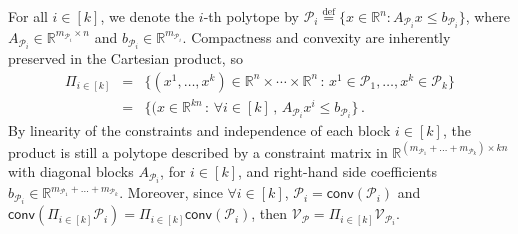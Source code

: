 \documentclass[10pt,a4paper]{amsart}
\newcommand{\R}{\mathbb{R}}
\newcommand{\conv}[1]{\mathsf{conv}\left(#1\right)}
\newcommand{\defi}{\stackrel{\mathrm{\scriptscriptstyle def}}{=}}
\newcommand{\mP}{\mathcal{P}}
\renewenvironment{proof}%
{%
 \par\noindent{\bfseries\upshape \proofname\ }%
}%
{\jmlrQED}
\newcommand{\verts}[1]{\mathcal{V}_{#1}}
\begin{document}
\begin{proof}
For all $i \in [k]$, we denote the $i$-th polytope by $\mP_i \defi \{x \in \R^n : A_{\mP_i} x \le b_{\mP_i}\}$, where $A_{\mP_i} \in \R^{m_{\mP_i} \times n}$ and $b_{\mP_i} \in \R^{m_{\mP_i}}$.
Compactness and convexity are inherently preserved in the Cartesian product, so
\[
\begin{array}{rcl}
\Pi_{i \in [k]} &=& \{(x^1, \dots, x^k) \in \R^n\times\cdots \times\R^n\,:\, x^1 \in \mP_1, \dots, x^k \in \mP_k\}\\
&=& \{(x \in \R^{kn}\,:\, \forall i \in [k]\,,\, A_{\mP_i} x^i \le b_{\mP_i}\}\,.
\end{array}
\]
By linearity of the constraints and independence of each block $i \in [k]$,
the product is still a polytope described by a constraint matrix in $\R^{(m_{\mP_1}+\dots+m_{\mP_k})\times kn}$ with diagonal blocks $A_{\mP_i}$, for $i \in [k]$, and right-hand side coefficients $b_{\mP_i} \in \R^{m_{\mP_1}+\dots+m_{\mP_k}}$.
Moreover, since $\forall i \in [k]$, $\mP_i = \conv{\mP_i}$ and $\conv{\Pi_{i \in [k]}\mP_i} = \Pi_{i \in [k]}\conv{\mP_i}$, then $\verts{\mP} = \Pi_{i \in [k]}\verts{\mP_i}$.

\end{proof}
\end{document}
